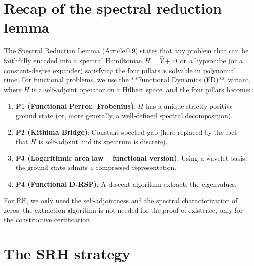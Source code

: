 \documentclass[11pt,a4paper]{article}
\begin{document}
\section{Recap of the spectral reduction lemma}

The Spectral Reduction Lemma (Article 0.9) states that any problem that can be faithfully encoded into a spectral Hamiltonian $H = \hat{V} + \Delta$ on a hypercube (or a constant‑degree expander) satisfying the four pillars is solvable in polynomial time. For functional problems, we use the **Functional Dynamics (FD)** variant, where $H$ is a self‑adjoint operator on a Hilbert space, and the four pillars become:

\begin{enumerate}
\item \textbf{P1 (Functional Perron–Frobenius)}: $H$ has a unique strictly positive ground state (or, more generally, a well‑defined spectral decomposition).
\item \textbf{P2 (Kithima Bridge)}: Constant spectral gap (here replaced by the fact that $H$ is self‑adjoint and its spectrum is discrete).
\item \textbf{P3 (Logarithmic area law – functional version)}: Using a wavelet basis, the ground state admits a compressed representation.
\item \textbf{P4 (Functional D‑RSP)}: A descent algorithm extracts the eigenvalues.
\end{enumerate}
For RH, we only need the self‑adjointness and the spectral characterization of zeros; the extraction algorithm is not needed for the proof of existence, only for the constructive certification.

\section{The SRH strategy}
\end{document}
